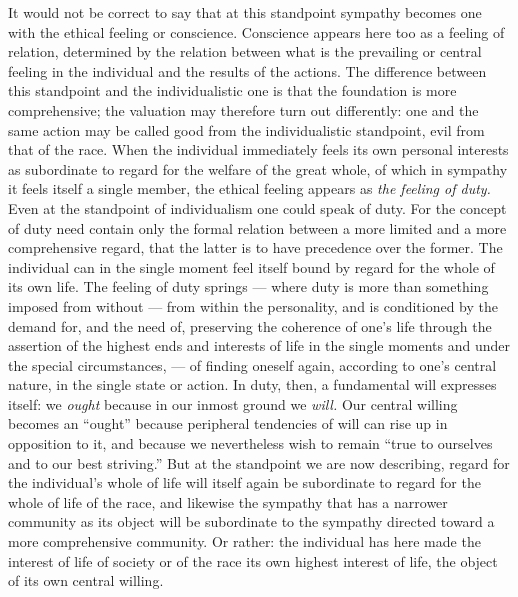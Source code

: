 \documentclass[12pt,a4paper,openany]{book}
\newcommand{\opage}[1]{\marginnote{\footnotesize\textit{[#1]}}}
\begin{document}
It would not be correct to say that at this standpoint sympathy becomes one with the ethical feeling
or conscience. Conscience appears here too as a feeling of relation, determined by the relation
between what is the prevailing or central feeling in the individual and the results of the actions.
The difference between this standpoint and the individualistic one is that the foundation is more
comprehensive; the valuation may therefore turn out differently: one and the same action may be
called good from the individualistic standpoint, evil from that of the race. When the individual
immediately feels its own personal interests as subordinate to regard for the welfare of the great
whole, of which in sympathy it feels itself a single member, the ethical feeling appears as
\textit{the feeling of duty.} Even at the standpoint of individualism one could speak of duty. For the
concept of duty need contain only the formal relation between a more limited and a more
comprehensive regard, that the latter is to have precedence over the former. The individual can in
the single moment feel itself bound by regard for the whole of its own life. The feeling of duty
springs --- where duty is more than something imposed from without --- from within the personality,
and is conditioned by the demand for, and the need of, preserving the coherence of one's life through
the assertion of the highest ends and interests of life in the single moments and under the special
circumstances, --- of finding oneself again, according to one's central nature, in the single state
or action. In duty, then, a fundamental will expresses itself: we \textit{ought} because in our
inmost ground we \textit{will.} Our central willing becomes an ``ought'' because peripheral tendencies
of will can rise up
\opage{40}in opposition to it, and because we nevertheless wish to remain ``true to ourselves and to our best
striving.'' But at the standpoint we are now describing, regard for the individual's whole of life
will itself again be subordinate to regard for the whole of life of the race, and likewise the
sympathy that has a narrower community as its object will be subordinate to the sympathy directed
toward a more comprehensive community. Or rather: the individual has here made the interest of life
of society or of the race its own highest interest of life, the object of its own central willing.
\end{document}
